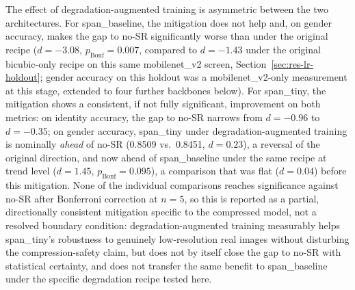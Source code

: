 \documentclass[11pt]{article}
\begin{document}
\begin{table}[H]
\centering
\caption{Real low-resolution holdout under degradation-augmented training, pairwise comparisons ($d$, $p_{\text{Bonf}}$; family of 3 per metric), $n{=}5$ seeds. Gender accuracy uses EarVN1.0's folder-range gender convention (Section~\ref{sec:datasets}), not an independently verified attribute.}
\label{tab:degradation-holdout-pairwise}
\end{table}

The effect of degradation-augmented training is asymmetric between the two architectures. For span\_baseline, the mitigation does not help and, on gender accuracy, makes the gap to no-SR significantly worse than under the original recipe ($d{=}{-}3.08$, $p_{\text{Bonf}}{=}0.007$, compared to $d{=}{-}1.43$ under the original bicubic-only recipe on this same mobilenet\_v2 screen, Section~\ref{sec:res-lr-holdout}; gender accuracy on this holdout was a mobilenet\_v2-only measurement at this stage, extended to four further backbones below). For span\_tiny, the mitigation shows a consistent, if not fully significant, improvement on both metrics: on identity accuracy, the gap to no-SR narrows from $d{=}{-}0.96$ to $d{=}{-}0.35$; on gender accuracy, span\_tiny under degradation-augmented training is nominally \emph{ahead} of no-SR (0.8509 vs.\ 0.8451, $d{=}0.23$), a reversal of the original direction, and now ahead of span\_baseline under the same recipe at trend level ($d{=}1.45$, $p_{\text{Bonf}}{=}0.095$), a comparison that was flat ($d{=}0.04$) before this mitigation. None of the individual comparisons reaches significance against no-SR after Bonferroni correction at $n{=}5$, so this is reported as a partial, directionally consistent mitigation specific to the compressed model, not a resolved boundary condition: degradation-augmented training measurably helps span\_tiny's robustness to genuinely low-resolution real images without disturbing the compression-safety claim, but does not by itself close the gap to no-SR with statistical certainty, and does not transfer the same benefit to span\_baseline under the specific degradation recipe tested here.
\end{document}

